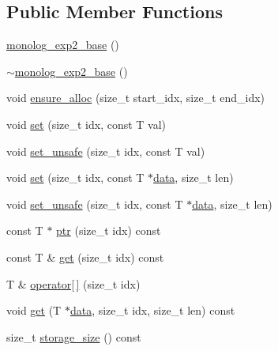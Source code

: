 \subsection*{Public Member Functions}
\begin{DoxyCompactItemize}
\item 
\hyperlink{classdialog_1_1monolog_1_1monolog__exp2__base_ac59fe74069159b44d64ed2395adb2fae}{monolog\+\_\+exp2\+\_\+base} ()
\item 
\hyperlink{classdialog_1_1monolog_1_1monolog__exp2__base_a4af0cf1b148d7b832d180da5c9ad389f}{$\sim$monolog\+\_\+exp2\+\_\+base} ()
\item 
void \hyperlink{classdialog_1_1monolog_1_1monolog__exp2__base_a86dd772a9b7beee2503a2349619a99ab}{ensure\+\_\+alloc} (size\+\_\+t start\+\_\+idx, size\+\_\+t end\+\_\+idx)
\item 
void \hyperlink{classdialog_1_1monolog_1_1monolog__exp2__base_a86d27f015adcd1320b4e1f811e1c1ceb}{set} (size\+\_\+t idx, const T val)
\item 
void \hyperlink{classdialog_1_1monolog_1_1monolog__exp2__base_ace9cdb67da6d6e9138705afb140b1560}{set\+\_\+unsafe} (size\+\_\+t idx, const T val)
\item 
void \hyperlink{classdialog_1_1monolog_1_1monolog__exp2__base_a11fb0491dea6bd8e0877a47c3f22708a}{set} (size\+\_\+t idx, const T $\ast$\hyperlink{structdialog_1_1data}{data}, size\+\_\+t len)
\item 
void \hyperlink{classdialog_1_1monolog_1_1monolog__exp2__base_a5e286b72175a394dfbb9bcf6e5c1fbc6}{set\+\_\+unsafe} (size\+\_\+t idx, const T $\ast$\hyperlink{structdialog_1_1data}{data}, size\+\_\+t len)
\item 
const T $\ast$ \hyperlink{classdialog_1_1monolog_1_1monolog__exp2__base_a76b101e66b927da18d6a723656a6a173}{ptr} (size\+\_\+t idx) const
\item 
const T \& \hyperlink{classdialog_1_1monolog_1_1monolog__exp2__base_acfb1656dd72bad1eba0d7e891899e3dc}{get} (size\+\_\+t idx) const
\item 
T \& \hyperlink{classdialog_1_1monolog_1_1monolog__exp2__base_acb8a92ddaabae330d33cb2bd9e14b642}{operator\mbox{[}$\,$\mbox{]}} (size\+\_\+t idx)
\item 
void \hyperlink{classdialog_1_1monolog_1_1monolog__exp2__base_abdff44f16e79714291fab191c9a9e19c}{get} (T $\ast$\hyperlink{structdialog_1_1data}{data}, size\+\_\+t idx, size\+\_\+t len) const
\item 
size\+\_\+t \hyperlink{classdialog_1_1monolog_1_1monolog__exp2__base_a908d3997fcc3790bced9e691223eb865}{storage\+\_\+size} () const
\end{DoxyCompactItemize}
